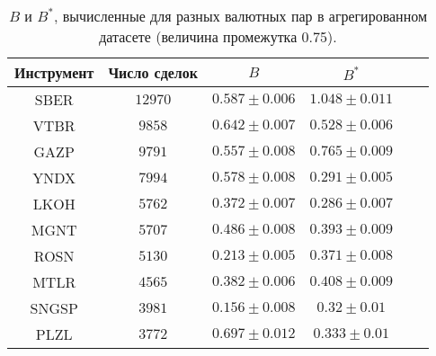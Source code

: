 \begin{table}[h!]
    \begin{center}
        \begin{tabular}{|c|c|c|c|c|c|}
            \hline
            Инструмент & Число сделок & $B$               & $B ^*$            \\ \hline
            SBER & $12970$ & $0.587 \pm 0.006$ & $1.048 \pm 0.011$ \\ \hline
            VTBR       & $9858$       & $0.642 \pm 0.007$ & $0.528 \pm 0.006$ \\ \hline
            GAZP       & $9791$       & $0.557 \pm 0.008$ & $0.765 \pm 0.009$ \\ \hline
            YNDX       & $7994$       & $0.578 \pm 0.008$ & $0.291 \pm 0.005$ \\ \hline
            LKOH       & $5762$       & $0.372 \pm 0.007$ & $0.286 \pm 0.007$ \\ \hline
            MGNT       & $5707$       & $0.486 \pm 0.008$ & $0.393 \pm 0.009$ \\ \hline
            ROSN       & $5130$       & $0.213 \pm 0.005$ & $0.371 \pm 0.008$ \\ \hline
            MTLR       & $4565$       & $0.382 \pm 0.006$ & $0.408 \pm 0.009$ \\ \hline
            SNGSP      & $3981$       & $0.156 \pm 0.008$ & $0.32 \pm 0.01$   \\ \hline
            PLZL       & $3772$       & $0.697 \pm 0.012$ & $0.333 \pm 0.01$  \\ \hline
        \end{tabular}
    \end{center}\caption{$B$ и $B ^*$, вычисленные для разных валютных пар в агрегированном датасете (величина промежутка 0.75).}
    \label{Aggreg1CU0.75} \end{table}

